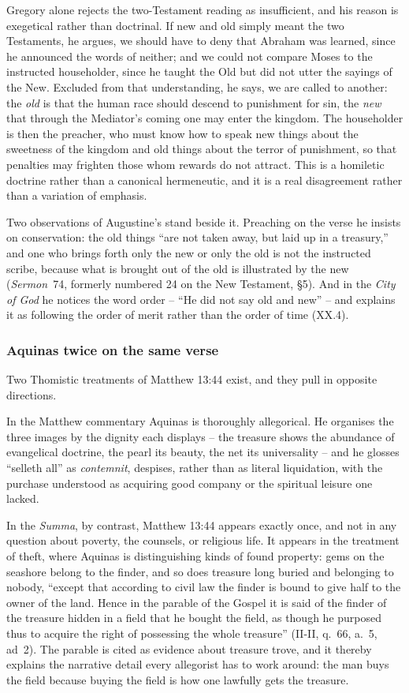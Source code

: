 Gregory alone rejects the two-Testament reading as insufficient, and his reason is exegetical rather than doctrinal. If new and old simply meant the two Testaments, he argues, we should have to deny that Abraham was learned, since he announced the words of neither; and we could not compare Moses to the instructed householder, since he taught the Old but did not utter the sayings of the New. Excluded from that understanding, he says, we are called to another: the \emph{old} is that the human race should descend to punishment for sin, the \emph{new} that through the Mediator's coming one may enter the kingdom. The householder is then the preacher, who must know how to speak new things about the sweetness of the kingdom and old things about the terror of punishment, so that penalties may frighten those whom rewards do not attract. This is a homiletic doctrine rather than a canonical hermeneutic, and it is a real disagreement rather than a variation of emphasis.

Two observations of Augustine's stand beside it. Preaching on the verse he insists on conservation: the old things ``are not taken away, but laid up in a treasury,'' and one who brings forth only the new or only the old is not the instructed scribe, because what is brought out of the old is illustrated by the new (\emph{Sermon}~74, formerly numbered 24 on the New Testament, §5). And in the \emph{City of God} he notices the word order -- ``He did not say old and new'' -- and explains it as following the order of merit rather than the order of time (XX.4).

\subsubsection*{Aquinas twice on the same verse}

Two Thomistic treatments of Matthew 13:44 exist, and they pull in opposite directions.

In the Matthew commentary Aquinas is thoroughly allegorical. He organises the three images by the dignity each displays -- the treasure shows the abundance of evangelical doctrine, the pearl its beauty, the net its universality -- and he glosses ``selleth all'' as \emph{contemnit}, despises, rather than as literal liquidation, with the purchase understood as acquiring good company or the spiritual leisure one lacked.

In the \emph{Summa}, by contrast, Matthew 13:44 appears exactly once, and not in any question about poverty, the counsels, or religious life. It appears in the treatment of theft, where Aquinas is distinguishing kinds of found property: gems on the seashore belong to the finder, and so does treasure long buried and belonging to nobody, ``except that according to civil law the finder is bound to give half to the owner of the land. Hence in the parable of the Gospel it is said of the finder of the treasure hidden in a field that he bought the field, as though he purposed thus to acquire the right of possessing the whole treasure'' (II-II, q.~66, a.~5, ad~2). The parable is cited as evidence about treasure trove, and it thereby explains the narrative detail every allegorist has to work around: the man buys the field because buying the field is how one lawfully gets the treasure.

